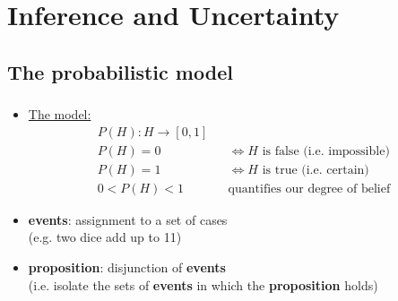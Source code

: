\section{Inference and Uncertainty}


\subsection{The probabilistic model}

\begin{frame}\frametitle{\subsecname}

\begin{itemize}
    \item \underline{The model:}\\
        \begin{align}
            P(H): H \rightarrow [0,1]&&\\
            P(H) = 0 && \iff H \text{ is false (i.e. impossible)} \\
            P(H) = 1 && \iff H \text{ is true (i.e. certain)} \\
            0 < P(H) < 1 && \text{quantifies our degree of belief}
        \end{align}
    \pause
    \item \textbf{events}: assignment to a set of cases\\
    (e.g. two dice add up to 11)
    \pause
    \item \textbf{proposition}: disjunction of \textbf{events}\\
    (i.e. isolate the sets of \textbf{events} in which the \textbf{proposition} holds)\\
    
\end{itemize}
    
\end{frame}

